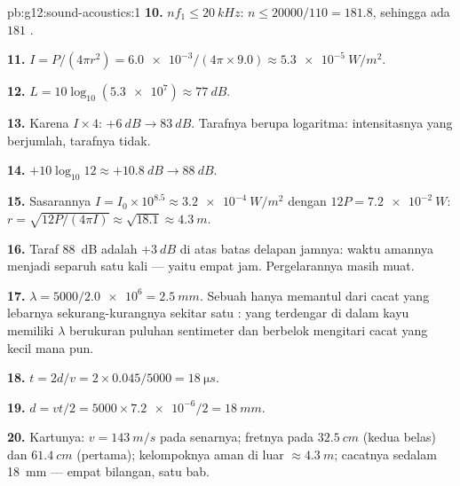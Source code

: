 \begin{solution}{pb:g12:sound-acoustics:1}
\textbf{10.} $nf_1 \le \qty{20}{kHz}$: $n \le 20000/110 = 181.8$,
sehingga ada $181$ .

\textbf{11.} $I = P/(4\pi r^2) = \num{6.0e-3}/(4\pi \times 9.0)
\approx \qty{5.3e-5}{W/m^2}$.

\textbf{12.} $L = 10\log_{10}(\num{5.3e7}) \approx \qty{77}{dB}$.

\textbf{13.} Karena $I \times 4$: $+\qty{6}{dB} \to \qty{83}{dB}$.
Tarafnya berupa logaritma: intensitasnya yang berjumlah, tarafnya
tidak.

\textbf{14.} $+10\log_{10}12 \approx +\qty{10.8}{dB} \to
\qty{88}{dB}$.

\textbf{15.} Sasarannya $I = I_0 \times 10^{8.5} \approx
\qty{3.2e-4}{W/m^2}$ dengan $12P = \qty{7.2e-2}{W}$:
$r = \sqrt{12P/(4\pi I)} \approx \sqrt{18.1} \approx \qty{4.3}{m}$.

\textbf{16.} Taraf \qty{88}{dB} adalah $+\qty{3}{dB}$ di atas batas
delapan jamnya: waktu amannya menjadi separuh satu kali --- yaitu empat
jam. Pergelarannya masih muat.

\textbf{17.} $\lambda = 5000/\num{2.0e6} = \qty{2.5}{mm}$. Sebuah
 hanya memantul dari cacat yang lebarnya sekurang-kurangnya
sekitar satu :  yang terdengar di dalam kayu
memiliki $\lambda$ berukuran puluhan sentimeter dan berbelok mengitari
cacat yang kecil mana pun.

\textbf{18.} $t = 2d/v = 2 \times 0.045/5000 = \qty{18}{\micro s}$.

\textbf{19.} $d = vt/2 = 5000 \times \num{7.2e-6}/2 = \qty{18}{mm}$.

\textbf{20.} Kartunya: $v = \qty{143}{m/s}$ pada senarnya; fretnya pada
$\qty{32.5}{cm}$ (kedua belas) dan $\qty{61.4}{cm}$ (pertama);
kelompoknya aman di luar $\approx \qty{4.3}{m}$; cacatnya sedalam
\qty{18}{mm} --- empat bilangan, satu bab.
\end{solution}
